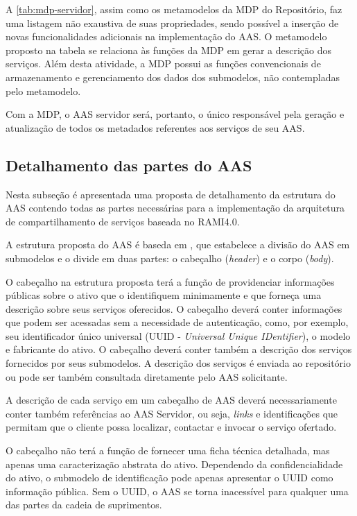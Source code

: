 	A \autoref{tab:mdp-servidor}, assim como os metamodelos da MDP do Repositório, faz uma listagem não exaustiva de suas propriedades, sendo possível a inserção de novas funcionalidades adicionais na implementação do AAS. O metamodelo proposto na tabela se relaciona às funções da MDP em gerar a descrição dos serviços. Além desta atividade, a MDP possui as funções convencionais de armazenamento e gerenciamento dos dados dos submodelos, não contempladas pelo metamodelo. 
	
	Com a MDP, o AAS servidor será, portanto, o único responsável pela geração e atualização de todos os metadados referentes aos serviços de seu AAS.

	
\subsection{Detalhamento das partes do AAS}

	Nesta subseção é apresentada uma proposta de detalhamento da estrutura do AAS contendo todas as partes necessárias para a implementação da arquitetura de compartilhamento de serviços baseada no RAMI4.0. 
	
	A estrutura proposta do AAS é baseda em , que estabelece a divisão do AAS em submodelos e o divide em duas partes: o cabeçalho (\textit{header}) e o corpo (\textit{body}).
	
	O cabeçalho na estrutura proposta terá a função de providenciar informações públicas sobre o ativo que o identifiquem minimamente e que forneça uma descrição sobre seus serviços oferecidos. O cabeçalho deverá conter informações que podem ser acessadas sem a necessidade de autenticação, como, por exemplo, seu identificador único universal (UUID - \textit{Universal Unique IDentifier}), o modelo e fabricante do ativo. O cabeçalho deverá conter também a descrição dos serviços fornecidos por seus submodelos. A descrição dos serviços é enviada ao repositório ou pode ser também consultada diretamente pelo AAS solicitante.
	
	A descrição de cada serviço em um cabeçalho de AAS deverá necessariamente conter também referências ao AAS Servidor, ou seja, \textit{links} e identificações que permitam que o cliente possa localizar, contactar e invocar o serviço ofertado.
	
	O cabeçalho não terá a função de fornecer uma ficha técnica detalhada, mas apenas uma caracterização abstrata do ativo. Dependendo da confidencialidade do ativo, o submodelo de identificação pode apenas apresentar o UUID como informação pública. Sem o UUID, o AAS se torna inacessível para qualquer uma das partes da cadeia de suprimentos.
	
